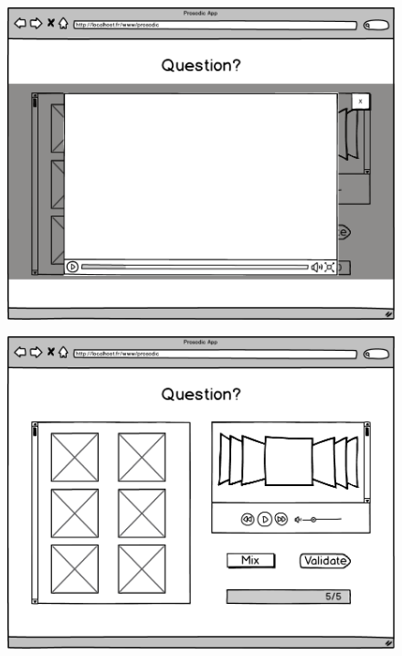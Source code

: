 \documentclass[a4paper,twoside,10pt]{report}
\begin{document}
 \begin{figure}[ht]
  \includegraphics[width=\textwidth]{F-2.png}
 \end{figure}
 
 \begin{figure}[ht]
  \includegraphics[width=\textwidth]{F-3.png}
 \end{figure}
 
\end{document}
